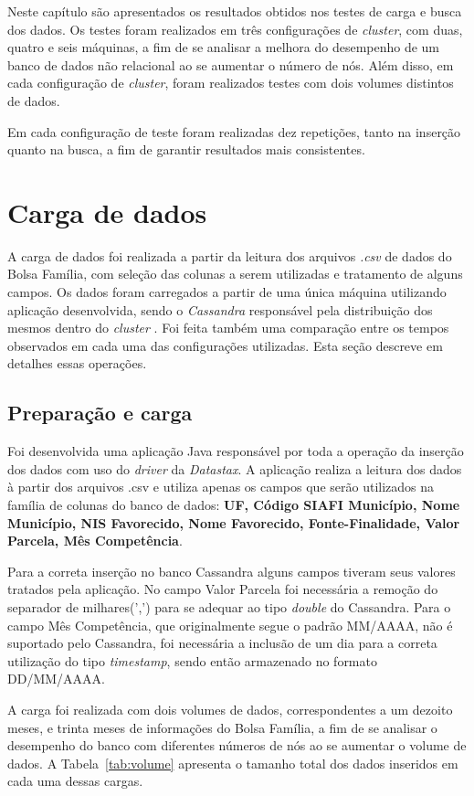 Neste capítulo são apresentados os resultados obtidos nos testes de carga e busca dos dados. Os testes foram realizados em três configurações de \emph{cluster}, com duas, quatro e seis máquinas, a fim de se analisar a melhora do desempenho de um banco de dados não relacional ao se aumentar o número de nós. Além disso, em cada configuração de \emph{cluster}, foram realizados testes com dois volumes distintos de dados.

Em cada configuração de teste foram realizadas dez repetições, tanto na inserção quanto na busca, a fim de garantir resultados mais consistentes. 

\section{Carga de dados}
A carga de dados foi realizada a partir da leitura dos arquivos \emph{.csv} de dados do Bolsa Família, com seleção das colunas a serem utilizadas e tratamento de alguns campos.
Os dados foram carregados a partir de uma única máquina utilizando aplicação desenvolvida, sendo o \emph{Cassandra} responsável pela distribuição dos mesmos dentro do \emph{cluster} . Foi feita também uma comparação entre os tempos observados em cada uma das configurações utilizadas. Esta seção descreve em detalhes essas operações.

\subsection{Preparação e carga}
Foi desenvolvida uma aplicação Java responsável por toda a operação da inserção dos dados com uso do \emph{driver} da \emph{Datastax}. A aplicação realiza a leitura dos dados à partir dos arquivos .csv e utiliza apenas os campos que serão utilizados na família de colunas do banco de dados: \textbf{UF, Código SIAFI Município, Nome Município, NIS Favorecido, Nome Favorecido, Fonte-Finalidade, Valor Parcela, Mês Competência}. 

Para a correta inserção no banco Cassandra alguns campos tiveram seus valores tratados pela aplicação. No campo Valor Parcela foi necessária a remoção do separador de milhares(',') para se adequar ao tipo \emph{double} do Cassandra. Para o campo Mês Competência, que originalmente segue o padrão MM/AAAA, não é suportado pelo Cassandra, foi necessária a inclusão de um dia para a correta utilização do tipo \emph{timestamp}, sendo então armazenado no formato DD/MM/AAAA.

A carga foi realizada com dois volumes de dados, correspondentes a um dezoito meses, e trinta meses de informações do Bolsa Família, a fim de se analisar o desempenho do banco com diferentes números de nós ao se aumentar o volume de dados. A Tabela~\ref{tab:volume} apresenta o tamanho total dos dados inseridos em cada uma dessas cargas.

